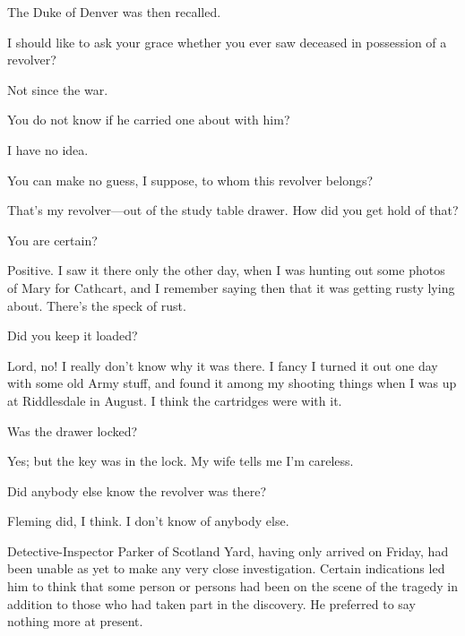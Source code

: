The Duke of Denver was then recalled.
\begin{dialogue}

 I should like to ask your grace whether you ever saw deceased in possession of a revolver?

 Not since the war.

 You do not know if he carried one about with him?

 I have no idea.

 You can make no guess, I suppose, to whom this revolver belongs?

  That's my revolver—out of the study table drawer. How did you get hold of that? 

 You are certain?

 Positive. I saw it there only the other day, when I was hunting out some photos of Mary for Cathcart, and I remember saying then that it was getting rusty lying about. There's the speck of rust.

 Did you keep it loaded?

 Lord, no! I really don't know why it was there. I fancy I turned it out one day with some old Army stuff, and found it among my shooting things when I was up at Riddlesdale in August. I think the cartridges were with it.

 Was the drawer locked?

 Yes; but the key was in the lock. My wife tells me I'm careless.

 Did anybody else know the revolver was there?

 Fleming did, I think. I don't know of anybody else.
\end{dialogue}

Detective-Inspector Parker of Scotland Yard, having only arrived on Friday, had been unable as yet to make any very close investigation.  Certain indications led him to think that some person or persons had been on the scene of the tragedy in addition to those who had taken part in the discovery. He preferred to say nothing more at present.


